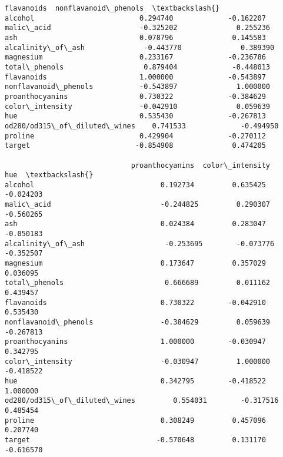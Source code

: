 \documentclass[11pt]{article}
\begin{document}
\begin{tcolorbox}[breakable, size=fbox, boxrule=.5pt, pad at break*=1mm, opacityfill=0]
\begin{Verbatim}[commandchars=\\\{\}]
                              flavanoids  nonflavanoid\_phenols  \textbackslash{}
alcohol                         0.294740             -0.162207
malic\_acid                     -0.325202              0.255236
ash                             0.078796              0.145583
alcalinity\_of\_ash              -0.443770              0.389390
magnesium                       0.233167             -0.236786
total\_phenols                   0.879404             -0.448013
flavanoids                      1.000000             -0.543897
nonflavanoid\_phenols           -0.543897              1.000000
proanthocyanins                 0.730322             -0.384629
color\_intensity                -0.042910              0.059639
hue                             0.535430             -0.267813
od280/od315\_of\_diluted\_wines    0.741533             -0.494950
proline                         0.429904             -0.270112
target                         -0.854908              0.474205

                              proanthocyanins  color\_intensity       hue  \textbackslash{}
alcohol                              0.192734         0.635425 -0.024203
malic\_acid                          -0.244825         0.290307 -0.560265
ash                                  0.024384         0.283047 -0.050183
alcalinity\_of\_ash                   -0.253695        -0.073776 -0.352507
magnesium                            0.173647         0.357029  0.036095
total\_phenols                        0.666689         0.011162  0.439457
flavanoids                           0.730322        -0.042910  0.535430
nonflavanoid\_phenols                -0.384629         0.059639 -0.267813
proanthocyanins                      1.000000        -0.030947  0.342795
color\_intensity                     -0.030947         1.000000 -0.418522
hue                                  0.342795        -0.418522  1.000000
od280/od315\_of\_diluted\_wines         0.554031        -0.317516  0.485454
proline                              0.308249         0.457096  0.207740
target                              -0.570648         0.131170 -0.616570


\end{Verbatim}
\end{tcolorbox}
\end{document}
